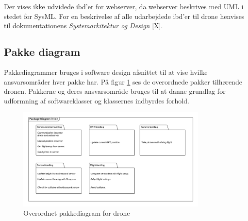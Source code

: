 Der vises ikke udvidede ibd'er for webserver, da webserver beskrives med UML i stedet for SysML. 
For en beskrivelse af alle udarbejdede ibd'er til drone henvises til dokumentationens \textit{Systemarkitektur og Design} [X].

\subsection{Pakke diagram}
\vspace{-0.3cm}	
Pakkediagrammer bruges i software design afsnittet til at vise hvilke ansvarsområder hver pakke har. På figur \ref{fig:package_drone} ses de overordnede pakker tilhørende dronen. Pakkerne og deres ansvarsområde bruges til at danne grundlag for udformning af softwareklasser og klassernes indbyrdes forhold.
 
\begin{figure}[H]
	\centering
	\includegraphics[width=0.85\textwidth]{Billeder/Projektbeskrivelse/Packagediagram_drone}
	\vspace{-0.3cm}	
	\caption{Overordnet pakkediagram for drone}
	\label{fig:package_drone}
\end{figure}